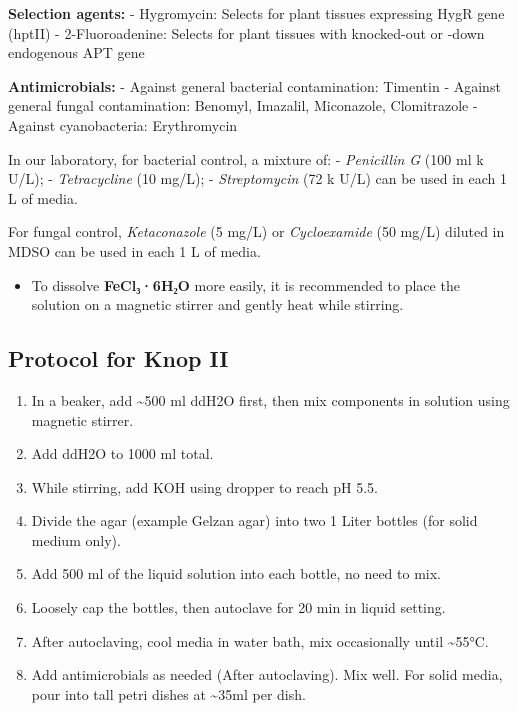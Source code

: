 \documentclass[
  11pt,
]{article}
\providecommand{\tightlist}{%
  \setlength{\itemsep}{0pt}\setlength{\parskip}{0pt}}
\begin{document}
\textbf{Selection agents:} - Hygromycin: Selects for plant tissues
expressing HygR gene (hptII) - 2-Fluoroadenine: Selects for plant
tissues with knocked-out or -down endogenous APT gene

\textbf{Antimicrobials:} - Against general bacterial contamination:
Timentin - Against general fungal contamination: Benomyl, Imazalil,
Miconazole, Clomitrazole - Against cyanobacteria: Erythromycin

In our laboratory, for bacterial control, a mixture of: -
\emph{Penicillin G} (100 ml k U/L); - \emph{Tetracycline} (10 mg/L); -
\emph{Streptomycin} (72 k U/L) can be used in each 1 L of media.

For fungal control, \emph{Ketaconazole} (5 mg/L) or \emph{Cycloexamide}
(50 mg/L) diluted in MDSO can be used in each 1 L of media.

\begin{itemize}
\tightlist
\item
  To dissolve \textbf{FeCl₃·6H₂O} more easily, it is recommended to
  place the solution on a magnetic stirrer and gently heat while
  stirring.
\end{itemize}

\subsection{Protocol for Knop II}\label{protocol-for-knop-ii}

\begin{enumerate}
\def\labelenumi{\arabic{enumi}.}
\tightlist
\item
  In a beaker, add \textasciitilde500 ml ddH2O first, then mix
  components in solution using magnetic stirrer.
\item
  Add ddH2O to 1000 ml total.
\item
  While stirring, add KOH using dropper to reach pH 5.5.
\item
  Divide the agar (example Gelzan agar) into two 1 Liter bottles (for
  solid medium only).
\item
  Add 500 ml of the liquid solution into each bottle, no need to mix.
\item
  Loosely cap the bottles, then autoclave for 20 min in liquid setting.
\item
  After autoclaving, cool media in water bath, mix occasionally until
  \textasciitilde55°C.
\item
  Add antimicrobials as needed (After autoclaving). Mix well. For solid
  media, pour into tall petri dishes at \textasciitilde35ml per dish.
\end{enumerate}
\end{document}
